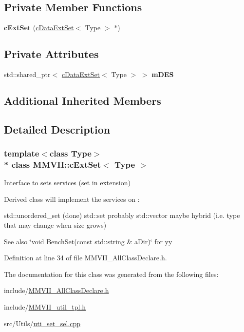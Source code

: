 \subsection*{Private Member Functions}
\begin{DoxyCompactItemize}
\item 
{\bfseries c\+Ext\+Set} (\hyperlink{classMMVII_1_1cDataExtSet}{c\+Data\+Ext\+Set}$<$ Type $>$ $\ast$)\hypertarget{classMMVII_1_1cExtSet_ac6c59db65d90ab91f76eae7bfd2bed1e}{}\label{classMMVII_1_1cExtSet_ac6c59db65d90ab91f76eae7bfd2bed1e}

\end{DoxyCompactItemize}
\subsection*{Private Attributes}
\begin{DoxyCompactItemize}
\item 
std\+::shared\+\_\+ptr$<$ \hyperlink{classMMVII_1_1cDataExtSet}{c\+Data\+Ext\+Set}$<$ Type $>$ $>$ {\bfseries m\+D\+ES}\hypertarget{classMMVII_1_1cExtSet_a0d5d16ea7b5fb6e57a183f7dda0db999}{}\label{classMMVII_1_1cExtSet_a0d5d16ea7b5fb6e57a183f7dda0db999}

\end{DoxyCompactItemize}
\subsection*{Additional Inherited Members}


\subsection{Detailed Description}
\subsubsection*{template$<$class Type$>$\\*
class M\+M\+V\+I\+I\+::c\+Ext\+Set$<$ Type $>$}

Interface to sets services (set in extension) 

Derived class will implement the services on \+:

std\+::unordered\+\_\+set (done) std\+::set probably std\+::vector maybe hybrid (i.\+e. type that may change when size grows)

See also \char`\"{}void Bench\+Set(const std\+::string \& a\+Dir)\char`\"{} for yy 

Definition at line 34 of file M\+M\+V\+I\+I\+\_\+\+All\+Class\+Declare.\+h.



The documentation for this class was generated from the following files\+:\begin{DoxyCompactItemize}
\item 
include/\hyperlink{MMVII__AllClassDeclare_8h}{M\+M\+V\+I\+I\+\_\+\+All\+Class\+Declare.\+h}\item 
include/\hyperlink{MMVII__util__tpl_8h}{M\+M\+V\+I\+I\+\_\+util\+\_\+tpl.\+h}\item 
src/\+Utils/\hyperlink{uti__set__sel_8cpp}{uti\+\_\+set\+\_\+sel.\+cpp}\end{DoxyCompactItemize}
